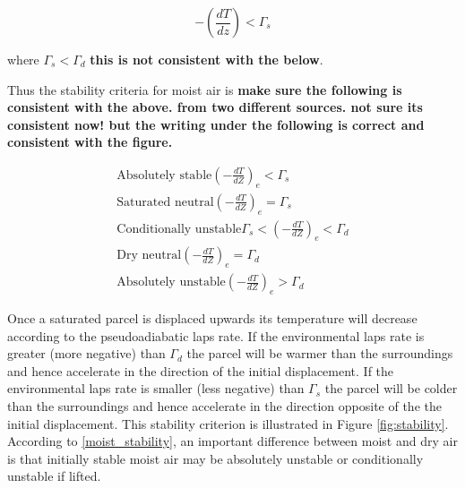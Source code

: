 \begin{equation}
    -(\frac{dT}{dz}) < \Gamma_s
\end{equation}

where $\Gamma_s < \Gamma_d$ \cite{marshall} \textbf{this is not consistent with the below}. 

Thus the stability criteria for moist air is \textbf{make sure the following is consistent with the above. from two different sources. not sure its consistent now! but the writing under the following is correct and consistent with the figure.}

\begin{equation}
\begin{gathered}
    \text{Absolutely stable} (-\frac{dT}{dZ})_e < \Gamma_s \\
    \text{Saturated neutral} (-\frac{dT}{dZ})_e = \Gamma_s \\
    \text{Conditionally unstable} \Gamma_s < (-\frac{dT}{dZ})_e < \Gamma_d \\
    \text{Dry neutral} (-\frac{dT}{dZ})_e  = \Gamma_d \\
    \text{Absolutely unstable} (-\frac{dT}{dZ})_e > \Gamma_d
    \label{moist_stability}
\end{gathered}
\end{equation}

Once a saturated parcel is displaced upwards its temperature will decrease according to the pseudoadiabatic laps rate. If the environmental laps rate is greater (more negative) than $\Gamma_d$ the parcel will be warmer than the surroundings and hence accelerate in the direction of the initial displacement. If the environmental laps rate is smaller (less negative) than $\Gamma_s$ the parcel will be colder than the surroundings and hence accelerate in the direction opposite of the the initial displacement. This stability criterion is illustrated in Figure \eqref{fig:stability}. According to \eqref{moist_stability}, an important difference between moist and dry air is that initially stable moist air may be absolutely unstable or conditionally unstable if lifted.  

